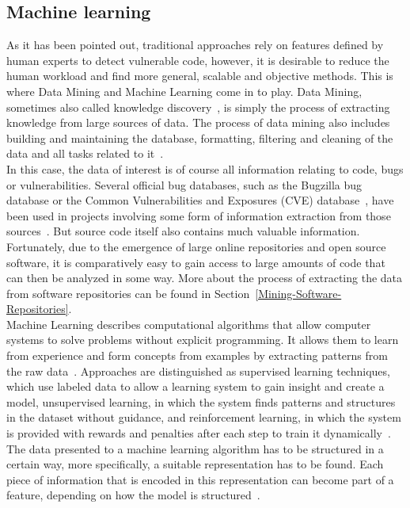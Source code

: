 \documentclass[
a4paper,
pagesize,
pdftex,
12pt,
ngerman,
fleqn,
final,
]{scrartcl}
\begin{document}
	\subsection{Machine learning} 
	As it has been pointed out, traditional approaches rely on features defined by human experts to detect vulnerable code, however, it is desirable to reduce the human workload and find more general, scalable and objective methods. This is where Data Mining and Machine Learning come in to play. Data Mining, sometimes also called knowledge discovery~\cite{Mitchell.1999}, is simply the process of extracting knowledge from large sources of data. The process of data mining also includes building and maintaining the database, formatting, filtering and cleaning of the data and all tasks related to it~\cite{Mitchell.1999}.\\
	In this case, the data of interest is of course all information relating to code, bugs or vulnerabilities. Several official bug databases, such as the Bugzilla bug database or the Common Vulnerabilities and Exposures (CVE) database~\cite{CVE}, have been used in projects involving some form of information extraction from those sources~\cite{Wijayasekara.2012}. But source code itself also contains much valuable information. Fortunately, due to the emergence of large online repositories and open source software, it is comparatively easy to gain access to large amounts of code that can then be analyzed in some way. More about the process of extracting the data from software repositories can be found in Section~\ref{Mining-Software-Repositories}.\\
	Machine Learning describes computational algorithms that allow computer systems to solve problems without explicit programming. It allows them to learn from experience and form concepts from examples by extracting patterns from the raw data~\cite{Goodfellow.2016}. Approaches are distinguished as supervised learning techniques, which use labeled data to allow a learning system to gain insight and create a model, unsupervised learning, in which the system finds patterns and structures in the dataset without guidance, and reinforcement learning, in which the system is provided with rewards and penalties after each step to train it dynamically~\cite{Mitchell.1997}.\\
	The data presented to a machine learning algorithm has to be structured in a certain way, more specifically, a suitable representation has to be found. Each piece of information that is encoded in this representation can become part of a feature, depending on how the model is structured~\cite{Goodfellow.2016}. 
\end{document}

